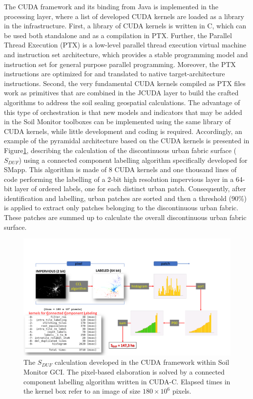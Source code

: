 \documentclass[APA,LATO1COL,doublespace]{WileyNJD-v2}
\begin{document}
The CUDA framework and its binding from Java is implemented in the processing layer, where a list of developed CUDA kernels are loaded as a library in the infrastructure. 
First, a library of CUDA kernels is written in C, which can be used both standalone and as a compilation in PTX. 
Further, the Parallel Thread Execution (PTX) is a low-level parallel thread execution virtual machine and instruction set architecture, which provides a stable programming model and instruction set for general purpose parallel programming. 
Moreover, the PTX instructions are optimized for and translated to native target-architecture instructions. 
Second, the very fundamental CUDA kernels compiled as PTX files work as primitives that are combined in the JCUDA layer to build the crafted algorithms to address the soil sealing geospatial calculations. 
The advantage of this type of orchestration is that new models and indicators that may be added in the Soil Monitor toolboxes can be implemented using the same library of CUDA kernels, while little development and coding is required. 
Accordingly, an example of the pyramidal architecture based on the CUDA kernels is presented in Figure\ref{fig:ccl}, describing the calculation of the discontinuous urban fabric surface ($S_{DUF}$) using a connected component labelling algorithm specifically developed for SMapp. 
This algorithm is made of 8 CUDA kernels and one thousand lines of code performing the labelling of a 2-bit high resolution impervious layer in a 64-bit layer of ordered labels, one for each distinct urban patch.
Consequently, after identification and labelling, urban patches are sorted and then a threshold (90\%) is applied to extract only patches belonging to the discontinuous urban fabric. 
These patches are summed up to calculate the overall discontinuous urban fabric surface.

\begin{figure}[t]
    \centerline{\includegraphics[width=500pt]{Figure03.pdf}}
    \caption{ The $S_{DUF}$ calculation developed in the CUDA framework within Soil Monitor GCI. 
    The pixel-based elaboration is solved by a connected component labelling algorithm written in CUDA-C. 
    Elapsed times in the kernel box refer to an image of size $180 \times 10^6$ pixels.} \label{fig:ccl}
\end{figure}
\end{document}
